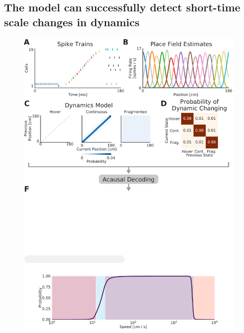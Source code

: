 \documentclass[times, twoside]{zHenriquesLab-StyleBioRxiv}
\begin{document}
\subsection*{The model can successfully detect short-time scale changes in dynamics}

\begin{figure}%
\centering
\includegraphics[width=0.80\linewidth]{figures/Figure1/Figure1_v3}

\end{figure}
\end{document}
